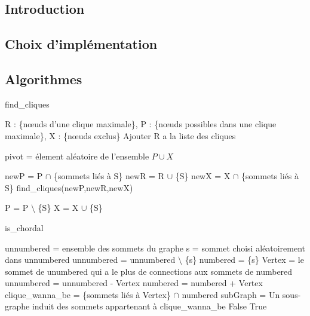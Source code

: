 \documentclass{article}
\begin{document}
	
	\subsection{Introduction}
	
	\subsection{Choix d'implémentation}
	
	\subsection{Algorithmes}
	
		\begin{algorithm}[H]
		\caption{find\_cliques}
		\begin{algorithmic}[1]
		\REQUIRE R : \{nœuds d'une clique maximale\}, P : \{nœuds possibles dans une clique maximale\}, X : \{nœuds exclus\}
		\STATE Ajouter R a la liste des cliques
		\ENDIF
		
		\ELSE
		
		\STATE pivot = élement aléatoire de l'ensemble $P \cup X $
		
		
		\STATE newP = P $\cap$ \{sommets liés à S\}
		\STATE newR = R $\cup$ \{S\}
		\STATE newX = X $\cap$ \{sommets liés à S\}
		\STATE find\_cliques(newP,newR,newX)
		
		\STATE P = P $\setminus$ \{S\}
		\STATE X = X $\cup$ \{S\}
		\ENDFOR		
		
		\ENDIF
	
	
		\end{algorithmic}
		\end{algorithm}

		\begin{algorithm}[H]
		\caption{is\_chordal}
		\begin{algorithmic}[1]		
		
		\STATE unnumbered = ensemble des sommets du graphe
		\STATE s = sommet choisi aléatoirement dans unnumbered
		\STATE unnumbered = unnumbered $\setminus$ \{s\}
		\STATE numbered  = \{s\}
			\STATE Vertex = le sommet de unumbered qui a le plus de connections aux sommets de numbered
			\STATE unnumbered = unnumbered - Vertex
			\STATE numbered = numbered + Vertex
			\STATE clique\_wanna\_be = \{sommets liés à Vertex\} $\cap$ numbered
			\STATE subGraph	= Un sous-graphe induit des sommets appartenant à clique\_wanna\_be
				\RETURN False
			\ENDIF
		\ENDWHILE
		\RETURN True
		\end{algorithmic}
		\end{algorithm}
\end{document}
